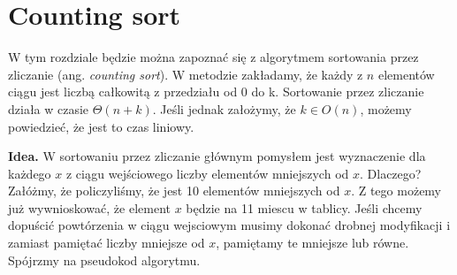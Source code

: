 \section{Counting sort}

W tym rozdziale będzie można zapoznać się z algorytmem sortowania przez zliczanie (ang. \textit{counting sort}). 
W metodzie zakładamy, że każdy z $n$ elementów ciągu jest liczbą całkowitą z przedziału od 0 do k.
Sortowanie przez zliczanie działa w czasie $\Theta(n+k)$.
Jeśli jednak założymy, że $k \in O(n)$, możemy powiedzieć, że jest to czas liniowy.

\textbf{Idea.} W sortowaniu przez zliczanie głównym pomysłem jest wyznaczenie dla każdego $x$ z ciągu wejściowego liczby elementów mniejszych od $x$.
Dlaczego?
Załóżmy, że policzyliśmy, że jest 10 elementów mniejszych od $x$.
Z tego możemy już wywnioskować, że element $x$ będzie na 11 miescu w tablicy.
Jeśli chcemy dopuścić powtórzenia w ciągu wejsciowym musimy dokonać drobnej modyfikacji i zamiast pamiętać liczby mniejsze od $x$, pamiętamy te mniejsze lub równe.
Spójrzmy na pseudokod algorytmu.

